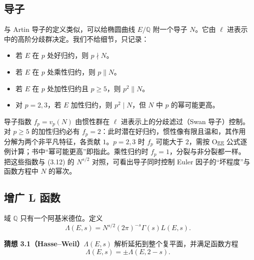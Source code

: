\subsection{导子}\label{c5:sec:3.2}

与 Artin 导子的定义类似，可以给椭圆曲线 $E/\mathbb{Q}$ 附一个导子 $N$。它由 $\ell$ 进表示中的高阶分歧群决定。我们不给细节，只记录：

\begin{itemize}
\item 若 $E$ 在 $p$ 处好归约，则 $p\nmid N$。
\item 若 $E$ 在 $p$ 处乘性归约，则 $p\parallel N$。
\item 若 $E$ 在 $p$ 处加性归约且 $p\ge5$，则 $p^2\parallel N$。
\item 对 $p=2,3$，若 $E$ 加性归约，则 $p^2\mid N$，但 $N$ 中 $p$ 的幂可能更高。
\end{itemize}

\begin{annote}
导子指数 $f_p=v_p(N)$ 由惯性群在 $\ell$ 进表示上的分歧滤过（Swan 导子）控制。对 $p\ge5$ 的加性归约必有 $f_p=2$：此时潜在好归约，惯性像有限且温和，其作用分解为两个非平凡特征，各贡献 $1$。$p=2,3$ 时 $f_p$ 可能大于 $2$，需按 Ogg 公式逐例计算；书中“幂可能更高”即指此。乘性归约时 $f_p=1$，分裂与非分裂都一样。把这些指数与 (3.12) 的 $N^{s/2}$ 对照，可看出导子同时控制 Euler 因子的“坏程度”与函数方程中 $N$ 的幂次。
\par\vspace{0.15em}{\raggedleft 【来源：Silverman《The Arithmetic of Elliptic Curves》第 IV 章（A）；Ogg《Elliptic curves and wild ramification》（A）】\par}
\end{annote}

\subsection{增广 L 函数}\label{c5:sec:3.3}

域 $\mathbb{Q}$ 只有一个阿基米德位。定义
\begin{equation}\tag{3.12}\label{c5:eq:3.12}
\Lambda(E,s)=N^{s/2}(2\pi)^{-s}\Gamma(s)L(E,s).
\end{equation}

\par\medskip\noindent\textbf{猜想 3.1（Hasse--Weil）}\quad $\Lambda(E,s)$ 解析延拓到整个复平面，并满足函数方程
\begin{equation}\tag{3.13}\label{c5:eq:3.13}
\Lambda(E,s)=\pm\Lambda(E,2-s).
\end{equation}

